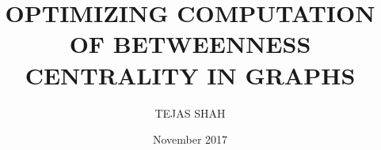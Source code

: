 \documentclass[MTech]{iitmdiss}
\def\thesistitle{OPTIMIZING COMPUTATION OF BETWEENNESS CENTRALITY IN GRAPHS}
\def\thesisauthor{TEJAS SHAH}
\begin{document}


\title{\thesistitle}
\author{\thesisauthor}
\date{November 2017}

\begin{singlespace}
\maketitle 
\end{singlespace} 






\begin{singlespace}
\tableofcontents
\thispagestyle{empty}
\listoftables
{}
\listoffigures
{}
\end{singlespace}









%
\nocite{*}
\pagebreak
\begin{singlespace}
  \begin{small}
    
	
  \end{small}
\end{singlespace}
\end{document}
